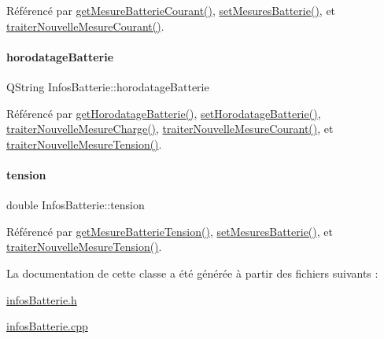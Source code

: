 Référencé par \hyperlink{class_infos_batterie_a17a55f19c132026091217c243bf402c0}{get\+Mesure\+Batterie\+Courant()}, \hyperlink{class_infos_batterie_ab1b2945b7d7c1a6207e29369690a27b9}{set\+Mesures\+Batterie()}, et \hyperlink{class_infos_batterie_a7c127f1798ba279918b7b0783f9d23c4}{traiter\+Nouvelle\+Mesure\+Courant()}.

\mbox{\label{class_infos_batterie_a261067aff87023bccd60e59961ef1ffc}} 
\paragraph{\texorpdfstring{horodatage\+Batterie}{horodatageBatterie}}
{\footnotesize\ttfamily Q\+String Infos\+Batterie\+::horodatage\+Batterie\hspace{0.3cm}{\ttfamily [private]}}



Référencé par \hyperlink{class_infos_batterie_aeac9a7bcd953444f4f2302d7949c74ef}{get\+Horodatage\+Batterie()}, \hyperlink{class_infos_batterie_a1d98a79696389d0264959d0c8a64bbcd}{set\+Horodatage\+Batterie()}, \hyperlink{class_infos_batterie_a92c1afb1e022fe75cd7a0877d64e8d53}{traiter\+Nouvelle\+Mesure\+Charge()}, \hyperlink{class_infos_batterie_a7c127f1798ba279918b7b0783f9d23c4}{traiter\+Nouvelle\+Mesure\+Courant()}, et \hyperlink{class_infos_batterie_a8b1c1008d441b30f2cf38995fae3e0ca}{traiter\+Nouvelle\+Mesure\+Tension()}.

\mbox{\label{class_infos_batterie_a45d09805075337f7f2d4b84d02a2ee47}} 
\paragraph{\texorpdfstring{tension}{tension}}
{\footnotesize\ttfamily double Infos\+Batterie\+::tension\hspace{0.3cm}{\ttfamily [private]}}



Référencé par \hyperlink{class_infos_batterie_a470b96c2fe1fab6a187c6d0997bd76a8}{get\+Mesure\+Batterie\+Tension()}, \hyperlink{class_infos_batterie_ab1b2945b7d7c1a6207e29369690a27b9}{set\+Mesures\+Batterie()}, et \hyperlink{class_infos_batterie_a8b1c1008d441b30f2cf38995fae3e0ca}{traiter\+Nouvelle\+Mesure\+Tension()}.



La documentation de cette classe a été générée à partir des fichiers suivants \+:\begin{DoxyCompactItemize}
\item 
\hyperlink{infos_batterie_8h}{infos\+Batterie.\+h}\item 
\hyperlink{infos_batterie_8cpp}{infos\+Batterie.\+cpp}\end{DoxyCompactItemize}
